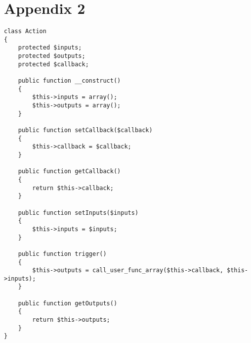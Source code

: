 \section*{Appendix 2}
\label{sec:app2}

\begin{lstlisting}
class Action
{
    protected $inputs;
    protected $outputs;
    protected $callback;

    public function __construct()
    {
        $this->inputs = array();
        $this->outputs = array();
    }

    public function setCallback($callback)
    {
        $this->callback = $callback;
    }

    public function getCallback()
    {
        return $this->callback;
    }

    public function setInputs($inputs)
    {
        $this->inputs = $inputs;
    }

    public function trigger()
    {
        $this->outputs = call_user_func_array($this->callback, $this->inputs);
    }

    public function getOutputs()
    {
        return $this->outputs;
    }
}
\end{lstlisting}